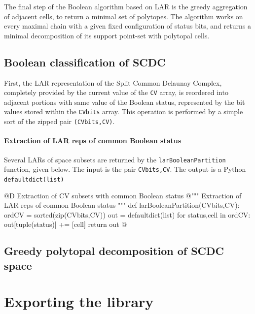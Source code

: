 \documentclass[11pt,oneside]{article}	%
\begin{document}
The final step of the Boolean algorithm based on LAR is the greedy aggregation of adjacent cells, to return a minimal set of polytopes. The algorithm works on every maximal chain with a given fixed configuration of status bits, and returns a minimal decomposition of its support point-set with polytopal cells.


\subsection{Boolean classification of SCDC}

First, the LAR representation of the Split Common Delaunay Complex, completely provided by the current value of the \texttt{CV} array, is reordered into adjacent portions with same value of the Boolean status, represented by the bit values stored within the \texttt{CVbits} array. This operation is performed by a simple sort of the zipped pair \texttt{(CVbits,CV)}. 

\paragraph{Extraction of LAR reps of common Boolean status}
Several LARs of space subsets are returned by the \texttt{larBooleanPartition} function, given below.
The input is the pair \texttt{CVbits,CV}. The output is a Python \texttt{defaultdict(list)} 

@D Extraction of CV subsets with common Boolean status
@{""" Extraction of LAR reps of common Boolean status """
def larBooleanPartition(CVbits,CV):
	ordCV = sorted(zip(CVbits,CV))
	out = defaultdict(list)
	for status,cell in ordCV:
		out[tuple(status)] += [cell]
	return out
@}


\subsection{Greedy polytopal decomposition of SCDC space}





\section{Exporting the library}
\end{document}
